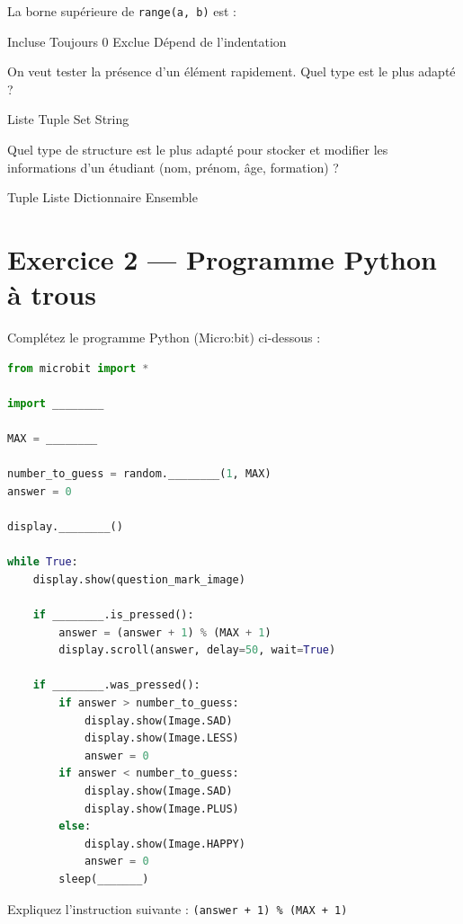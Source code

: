 \documentclass[11pt,a4paper]{exam}
\begin{document}
\begin{questions}
\question[1] La borne supérieure de \texttt{range(a, b)} est :
\begin{checkboxes}
  \choice Incluse
  \choice Toujours 0
  \choice Exclue
  \choice Dépend de l’indentation
\end{checkboxes}

\question[1] On veut tester la présence d’un élément rapidement. Quel type est le plus adapté ?
\begin{checkboxes}
  \choice Liste
  \choice Tuple
  \choice Set
  \choice String
\end{checkboxes}

\question[1] Quel type de structure est le plus adapté pour stocker et modifier les informations d’un étudiant (nom, prénom, âge, formation) ?
\begin{checkboxes}
  \choice Tuple
  \choice Liste
  \choice Dictionnaire
  \choice Ensemble
\end{checkboxes}

\end{questions}

\section*{Exercice 2 — Programme Python à trous}

\begin {questions}

\question[2] Complétez le programme Python (Micro:bit) ci-dessous :

\begin{lstlisting}[language=Python]
from microbit import *

import ________

MAX = ________

number_to_guess = random.________(1, MAX)
answer = 0

display.________()

while True:
    display.show(question_mark_image)
            
    if ________.is_pressed():
        answer = (answer + 1) % (MAX + 1)
        display.scroll(answer, delay=50, wait=True)

    if ________.was_pressed():
        if answer > number_to_guess:
            display.show(Image.SAD)
            display.show(Image.LESS)
            answer = 0
        if answer < number_to_guess:
            display.show(Image.SAD)
            display.show(Image.PLUS)
        else:
            display.show(Image.HAPPY)
            answer = 0
        sleep(_______)

\end{lstlisting}

\question[0.5] Expliquez l'instruction suivante : \verb|(answer + 1) % (MAX + 1)|

\end {questions}
\end{document}
